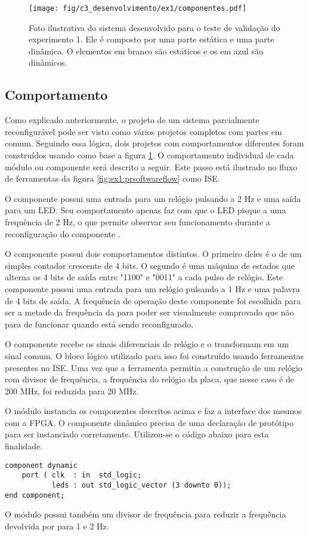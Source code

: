 \documentclass[11pt,a4paper,oneside]{book}
\begin{document}
\begin{figure}[h]
\centering
\texttt{[image: fig/c3\_desenvolvimento/ex1/componentes.pdf]}
\caption{Foto ilustrativa do sistema desenvolvido para o teste de validação do experimento 1. Ele é composto por uma parte estática e uma parte dinâmica. O elementos em branco são estáticos e os em azul são dinâmicos.}
\label{fig:ex1:componentes}
\end{figure}

\subsection{Comportamento}
Como explicado anteriormente, o projeto de um sistema parcialmente reconfigurável pode ser visto como vários projetos completos com partes em comum.
Seguindo essa lógica, dois projetos com comportamentos diferentes foram construídos usando como base a figura \ref{fig:ex1:componentes}.
O comportamento individual de cada módulo ou componente será descrito a seguir.
Este passo está ilustrado no fluxo de ferramentas da figura \ref{fig:ex1:prsoftwareflow} como ISE.

O componente  possui uma entrada para um relógio pulsando a 2 Hz e uma saída para um LED.
Seu comportamento apenas faz com que o LED pisque a uma frequência de 2 Hz, o que permite observar seu funcionamento durante a reconfiguração do componente .

O componente  possui dois comportamentos distintos.
O primeiro deles é o de um simples contador crescente de 4 bits.
O segundo é uma máquina de estados que alterna os 4 bits de saída entre "1100" e "0011" a cada pulso de relógio.
Este componente possui uma entrada para um relógio pulsando a 1 Hz e uma palavra de 4 bits de saída.
A frequência de operação deste componente foi escolhida para ser a metade da frequência da  para poder ser visualmente comprovado que  não para de funcionar quando  está sendo reconfigurado.

O componente  recebe os sinais diferenciais de relógio e o transformam em um sinal comum.
O bloco lógico utilizado para isso foi construído usando ferramentas presentes no ISE.
Uma vez que a ferramenta permitia a construção de um relógio com divisor de frequência, a frequência do relógio da placa, que nesse caso é de 200 MHz, foi reduzida para 20 MHz.

O módulo  instancia os componentes descritos acima e faz a interface dos mesmos com a FPGA.
O componente dinâmico precisa de uma declaração de protótipo para ser instanciado corretamente.
Utilizou-se o código abaixo para esta finalidade.
\begin{lstlisting}[style=customVHDL]
component dynamic
    port ( clk  : in  std_logic;
           leds : out std_logic_vector (3 downto 0));
end component;
\end{lstlisting}
O módulo  possui também um divisor de frequência para reduzir a frequência devolvida por  para 1 e 2 Hz.
\end{document}

